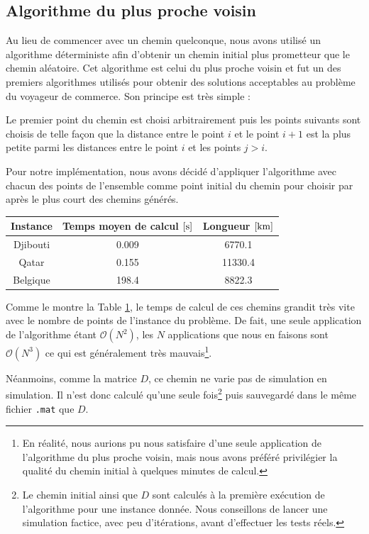 \documentclass[a4paper, 12pt]{report}
\begin{document}
    \subsection{Algorithme du plus proche voisin}\label{sec:NNA}
    Au lieu de commencer avec un chemin quelconque, nous avons utilisé un algorithme déterministe afin d'obtenir un chemin initial plus prometteur que le chemin aléatoire. Cet algorithme est celui du plus proche voisin \cite{wiki_nna} et fut un des premiers algorithmes utilisés pour obtenir des solutions acceptables au problème du voyageur de commerce. Son principe est très simple : \par 
    Le premier point du chemin est choisi arbitrairement puis les points suivants sont choisis de telle façon que la distance entre le point $i$ et le point $i + 1$ est la plus petite parmi les distances entre le point $i$ et les points $j > i$. \par
    Pour notre implémentation, nous avons décidé d'appliquer l'algorithme avec chacun des points de l'ensemble comme point initial du chemin pour choisir par après le plus court des chemins générés.
    \begin{table}[H]
        \centering
        \begin{tabular}{|c|c|c|}
            \hline
            Instance & Temps moyen de calcul $\left[\si{\second}\right]$ & Longueur $\left[\si{\kilo\meter}\right]$ \\ \hline\hline
            Djibouti & \num{0.009} & \num{6770.1} \\ \hline
            Qatar & \num{0.155} & \num{11330.4} \\ \hline
            Belgique & \num{198.4} & \num{8822.3} \\ \hline
        \end{tabular}
        \label{tab:nearest_neighbor_algorithm}
    \end{table}
    Comme le montre la Table \ref{tab:nearest_neighbor_algorithm}, le temps de calcul de ces chemins grandit très vite avec le nombre de points de l'instance du problème. De fait, une seule application de l'algorithme étant $\mathcal{O}(N^2)$, les $N$ applications que nous en faisons sont $\mathcal{O}(N^3)$ ce qui est généralement très mauvais\footnote{En réalité, nous aurions pu nous satisfaire d'une seule application de l'algorithme du plus proche voisin, mais nous avons préféré privilégier la qualité du chemin initial à quelques minutes de calcul.}. \par
    Néanmoins, comme la matrice $D$, ce chemin ne varie pas de simulation en simulation. Il n'est donc calculé qu'une seule fois\footnote{Le chemin initial ainsi que $D$ sont calculés à la première exécution de l'algorithme pour une instance donnée. Nous conseillons de lancer une simulation factice, avec peu d'itérations, avant d'effectuer les tests réels.} puis sauvegardé dans le même fichier \texttt{.mat} que $D$.
\end{document}
